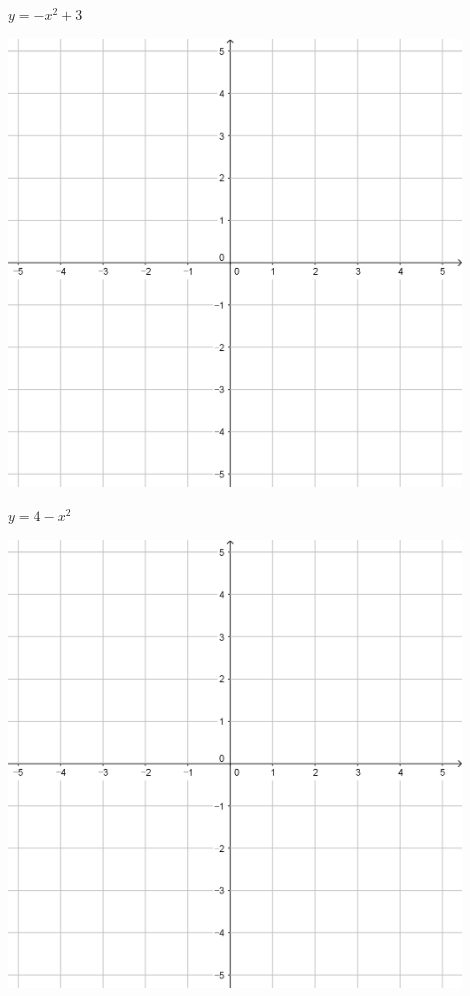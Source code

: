 \documentclass[a4paper]{oblivoir}
\begin{document}
\clearpage
\begin{minipage}{0.45\textwidth}\centering
\(y=-x^2+3\)
\par\bigskip\includegraphics[width=0.9\textwidth]{55}
\end{minipage}
\begin{minipage}{0.45\textwidth}\centering
\(y=4-x^2\)
\par\bigskip\includegraphics[width=0.9\textwidth]{55}
\end{minipage}\bigskip\bigskip\par
\end{document}
